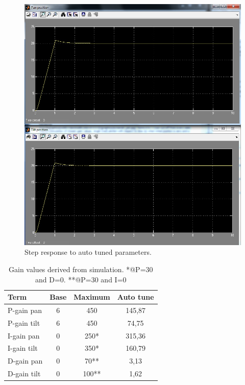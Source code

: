 \begin{figure}[htb]
  \centering
  \includegraphics[width=\textwidth,clip,trim=0 -10 0 0]{graphics/screensh_pid.jpg} %
	\caption{Step response to auto tuned parameters.}
	\label{fig:screensh_pid}
\end{figure}


\begin{table}[htb]				
	\centering
	\begin{tabular}{lccc}			
	Term & Base & Maximum & Auto tune \\			
	\midrule												
P-gain pan& 6 & 450 & 145,87\\
P-gain tilt& 6 & 450 & 74,75 \\
I-gain pan& 0 & 250* & 315,36  \\
I-gain tilt& 0 & 350* & 160,79 \\
D-gain pan& 0 & 70** & 3,13 \\
D-gain tilt& 0 & 100** & 1,62\\
	\end{tabular}
	\caption{Gain values derived from simulation. *@P=30 and D=0. **@P=30 and I=0}				
	\label{tab:gain_values}			
\end{table}


